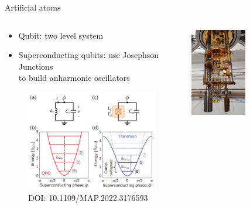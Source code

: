 \documentclass[aspectratio=169,10pt]{beamer}
\begin{document}
\begin{frame}{Artificial atoms}
  \begin{columns}
    \begin{column}{0.6\textwidth}
      \centering
      \begin{itemize}
        \item Qubit: two level system
        \hspace{10 mm}
        \item Superconducting qubits: use Josephson Junctions\\ to build anharmonic oscillators
      \end{itemize}
      \begin{figure}
        \includegraphics[height=0.5\textheight]{figures/Transmon.png}
        \caption{DOI: 10.1109/MAP.2022.3176593}
      \end{figure}
    \end{column}
    \begin{column}{0.6\textwidth}
      \centering
      \includegraphics[width=0.5\textwidth]{figures/cryostat.png}
    \end{column}
  \end{columns}
\end{frame}
\end{document}
